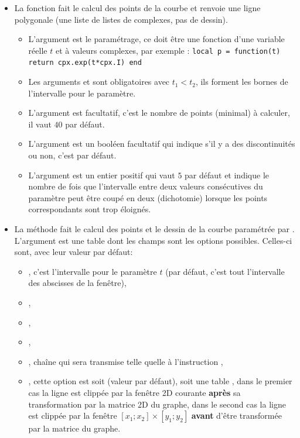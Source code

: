 \begin{itemize}
\item La fonction  fait le calcul des points de la courbe et renvoie une ligne polygonale (une liste de listes de complexes, pas de dessin).
  \begin{itemize}
    \item L'argument  est le paramétrage, ce doit être une fonction d'une variable réelle $t$ et à valeurs complexes, par exemple :
    \texttt{local p = function(t) return cpx.exp(t*cpx.I) end}
    \item  Les arguments  et  sont obligatoires avec \(t_1 < t_2\), ils forment les bornes de l'intervalle pour le paramètre.
    \item L'argument  est facultatif, c'est le nombre de points (minimal) à calculer, il vaut $40$ par défaut.
    \item L'argument  est un booléen facultatif qui indique s'il y a des discontinuités ou non, c'est \false par défaut.
    \item L'argument  est un entier positif qui vaut $5$ par défaut et indique le nombre de fois que l'intervalle entre deux valeurs consécutives du paramètre peut être coupé en deux (dichotomie) lorsque les points correspondants sont trop éloignés.
  \end{itemize}
  
\item La méthode  fait le calcul des points et le dessin de la courbe paramétrée par . L'argument  est une table dont les champs sont les options possibles. Celles-ci sont, avec leur valeur par défaut:

  \begin{itemize}
      \item {}, c'est l'intervalle pour le paramètre $t$ (par défaut, c'est tout l'intervalle des abscisses de la fenêtre), 
      \item {}, 
      \item {},
      \item {},
      \item {},  chaîne qui sera transmise telle quelle à l'instruction \drawcmd,
      \item {}, cette option est soit \nil (valeur par défaut), soit une table , dans le premier cas la ligne est clippée par la fenêtre 2D courante \textbf{après} sa transformation par la matrice 2D du graphe, dans le second cas la ligne est clippée par la fenêtre $[x_1;x_2]\times[y_1;y_2]$ \textbf{avant} d'être transformée par la matrice du graphe.
  \end{itemize}
\end{itemize}  

